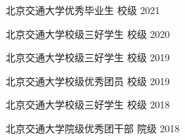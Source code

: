 \begin{cvhonors}
\cvhonor
{北京交通大学优秀毕业生} %
{校级} %
{2021} %

	\cvhonor
	{北京交通大学校级三好学生} %
	{校级} %
	{2020} %
	
	\cvhonor
	{北京交通大学校级三好学生} %
	{校级} %
	{2019} %

	\cvhonor
	{北京交通大学校级优秀团员} %
	{校级} %
	{2019} %
	
	\cvhonor
	{北京交通大学校级三好学生} %
	{校级} %
	{2018} %
	
	\cvhonor
	{北京交通大学院级优秀团干部} %
	{院级} %
	{2018} %
\end{cvhonors}
